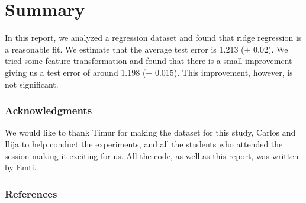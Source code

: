 \documentclass{article} %
\begin{document}


\section{Summary}
In this report, we analyzed a regression dataset and found that ridge regression is a reasonable fit. We estimate that the average test error is 1.213 ($\pm$ 0.02). We tried some feature transformation and found that there is a small improvement giving us a test error of around 1.198 ($\pm$ 0.015). This improvement, however, is not significant.


\subsubsection*{Acknowledgments}
We would like to thank Timur for making the dataset for this study, Carlos and Ilija to help conduct the experiments, and all the students who attended the session making it exciting for us. All the code, as well as this report, was written by Emti. 

\subsubsection*{References}
\end{document}
